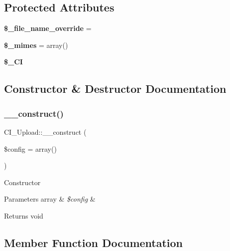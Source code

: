 \subsection*{Protected Attributes}
\begin{DoxyCompactItemize}
\item 
\mbox{\label{class_c_i___upload_acb039e4f20d4e7fb78cd330efa903107}} 
{\bfseries \$\+\_\+file\+\_\+name\+\_\+override} = \textquotesingle{}\textquotesingle{}
\item 
\mbox{\label{class_c_i___upload_a3d3e75a3116a5993ec309f93d0e953c1}} 
{\bfseries \$\+\_\+mimes} = array()
\item 
\mbox{\label{class_c_i___upload_a3f30db8a1fdd1d08350c5c74a495cc0c}} 
{\bfseries \$\+\_\+\+CI}
\end{DoxyCompactItemize}


\subsection{Constructor \& Destructor Documentation}
\mbox{\label{class_c_i___upload_a446f5c9d78b675eb696970ac51f7905a}} 
\subsubsection{\texorpdfstring{\+\_\+\+\_\+construct()}{\_\_construct()}}
{\footnotesize\ttfamily C\+I\+\_\+\+Upload\+::\+\_\+\+\_\+construct (\begin{DoxyParamCaption}\item[{}]{\$config = {\ttfamily array()} }\end{DoxyParamCaption})}

Constructor


\begin{DoxyParams}[1]{Parameters}
array & {\em \$config} & \\
\hline
\end{DoxyParams}
\begin{DoxyReturn}{Returns}
void 
\end{DoxyReturn}


\subsection{Member Function Documentation}
\mbox{\label{class_c_i___upload_a25b07a1451cfbaa708ebcef47943ce55}} 
